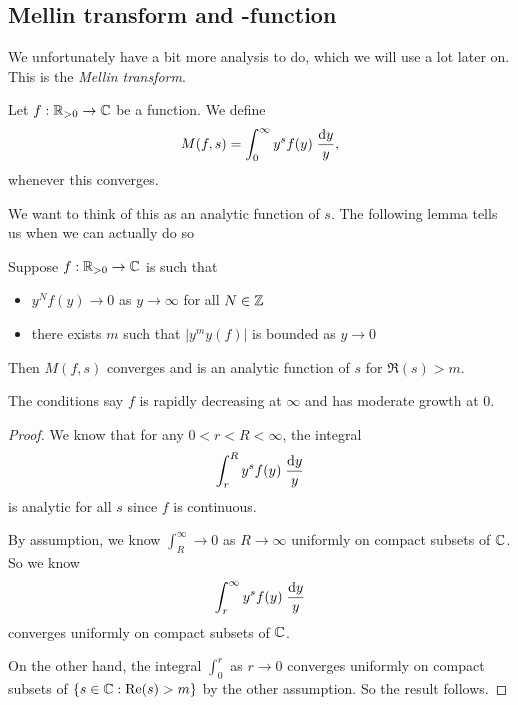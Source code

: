 \documentclass[a4paper]{article}
\begin{document}
\subsection{Mellin transform and -function}
We unfortunately have a bit more analysis to do, which we will use a lot later on. This is the \emph{Mellin transform}.

\begin{defi}
  Let $f: \mathbb{R}_{>0} \to\mathbb{C}$ be a function. We define
  \[
    M(f, s) = \int_0^\infty y^s f(y) \;\frac{\mathrm{d} y}{y},
  \]
  whenever this converges.
\end{defi}
We want to think of this as an analytic function of $s$. The following lemma tells us when we can actually do so
\begin{lemma}
  Suppose $f: \mathbb{R}_{>0} \to \mathbb{C}$ is such that
  \begin{itemize}
    \item $y^N f(y) \to 0$ as $y \to \infty$ for all $N \in \mathbb{Z}$
    \item there exists $m$ such that $|y^m y(f)|$ is bounded as $y \to 0$
  \end{itemize}
  Then $M(f, s)$ converges and is an analytic function of $s$ for $\Re(s) > m$.
\end{lemma}
The conditions say $f$ is rapidly decreasing at $\infty$ and has moderate growth at $0$.

\begin{proof}
  We know that for any $0 < r < R < \infty$, the integral
  \[
    \int_r^R y^s f(y) \;\frac{\mathrm{d} y}{y}
  \]
  is analytic for all $s$ since $f$ is continuous.

  By assumption, we know $\int_R^\infty \to 0$ as $R \to \infty$ uniformly on compact subsets of $\mathbb{C}$. So we know
  \[
    \int_r^\infty y^s f(y) \;\frac{\mathrm{d} y}{y}
  \]
  converges uniformly on compact subsets of $\mathbb{C}$.

  On the other hand, the integral $\int_0^r$ as $r \to 0$ converges uniformly on compact subsets of $\{s \in \mathbb{C}: \operatorname{Re}(s) > m\}$ by the other assumption. So the result follows.
\end{proof}
\end{document}
